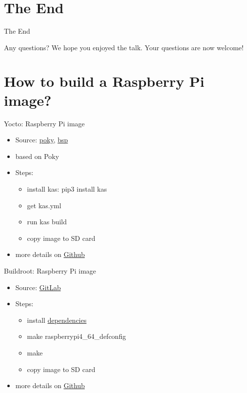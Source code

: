 \documentclass{beamer}
\begin{document}
\section{The End}

\begin{frame}{The End}
	\begin{block}{Any questions?}
		We hope you enjoyed the talk.
		Your questions are now welcome!
	\end{block}
\end{frame}

\section{How to build a Raspberry Pi image?}


\begin{frame}{Yocto: Raspberry Pi image}
	\begin{itemize}
		\item Source: \href{https://git.yoctoproject.org/poky}{poky}, \href{https://git.yoctoproject.org/meta-raspberrypi/}{bsp}
		\item based on Poky
		\item Steps:
		\begin{itemize}
			\item install kas: pip3 install kas
			\item get kas.yml
			\item run kas build
			\item copy image to SD card
		\end{itemize}
		\item more details on \href{https://github.com/tomirgang/eh21_maintainable_linux/tree/main/examples/first_build_rpi4/yocto}{Github}
	\end{itemize}
\end{frame}


\begin{frame}{Buildroot: Raspberry Pi image}
	\begin{itemize}
		\item Source: \href{https://gitlab.com/buildroot.org/buildroot/}{GitLab}
		\item Steps:
		\begin{itemize}
			\item install \href{https://buildroot.org/downloads/manual/manual.html\#requirement}{dependencies}
			\item make raspberrypi4\_64\_defconfig
			\item make
			\item copy image to SD card
		\end{itemize}
		\item more details on \href{https://github.com/tomirgang/eh21_maintainable_linux/tree/main/examples/first_build_rpi4/buildroot}{Github}
	\end{itemize}
\end{frame}
\end{document}
